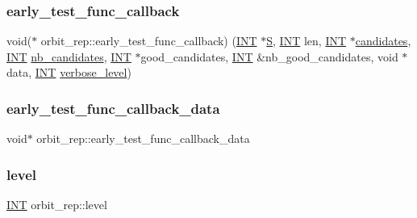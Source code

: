 \subsubsection{\texorpdfstring{early\+\_\+test\+\_\+func\+\_\+callback}{early\_test\_func\_callback}}
{\footnotesize\ttfamily void($\ast$ orbit\+\_\+rep\+::early\+\_\+test\+\_\+func\+\_\+callback) (\mbox{\hyperlink{galois_8h_a09fddde158a3a20bd2dcadb609de11dc}{I\+NT}} $\ast$\mbox{\hyperlink{simeon_8_c_adab47f8243f1b5a2c31df2535d6b37d0}{S}}, \mbox{\hyperlink{galois_8h_a09fddde158a3a20bd2dcadb609de11dc}{I\+NT}} len, \mbox{\hyperlink{galois_8h_a09fddde158a3a20bd2dcadb609de11dc}{I\+NT}} $\ast$\mbox{\hyperlink{classorbit__rep_ad0df86e7ddfadb6f059011f8251a14ae}{candidates}}, \mbox{\hyperlink{galois_8h_a09fddde158a3a20bd2dcadb609de11dc}{I\+NT}} \mbox{\hyperlink{classorbit__rep_a939fbf3e70ac58f85bd5dfd8365f3978}{nb\+\_\+candidates}}, \mbox{\hyperlink{galois_8h_a09fddde158a3a20bd2dcadb609de11dc}{I\+NT}} $\ast$good\+\_\+candidates, \mbox{\hyperlink{galois_8h_a09fddde158a3a20bd2dcadb609de11dc}{I\+NT}} \&nb\+\_\+good\+\_\+candidates, void $\ast$data, \mbox{\hyperlink{galois_8h_a09fddde158a3a20bd2dcadb609de11dc}{I\+NT}} \mbox{\hyperlink{simeon_8_c_a818073fbcc2f439e7c56952f67386122}{verbose\+\_\+level}})}

\mbox{\label{classorbit__rep_a4190d1ceef69ca81b0a2720d6f7abbe6}} 
\subsubsection{\texorpdfstring{early\+\_\+test\+\_\+func\+\_\+callback\+\_\+data}{early\_test\_func\_callback\_data}}
{\footnotesize\ttfamily void$\ast$ orbit\+\_\+rep\+::early\+\_\+test\+\_\+func\+\_\+callback\+\_\+data}

\mbox{\label{classorbit__rep_ae6a58248c3905598f5c711b6c9d3264e}} 
\subsubsection{\texorpdfstring{level}{level}}
{\footnotesize\ttfamily \mbox{\hyperlink{galois_8h_a09fddde158a3a20bd2dcadb609de11dc}{I\+NT}} orbit\+\_\+rep\+::level}

